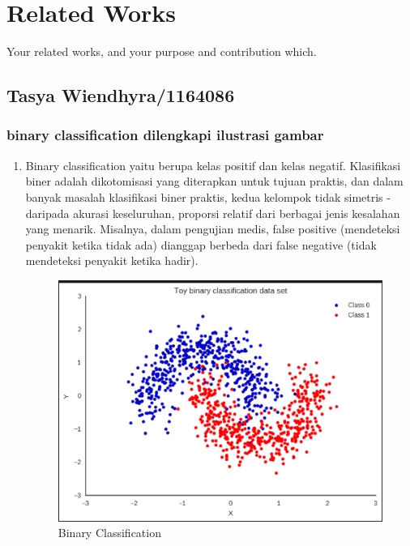 \chapter{Related Works}

Your related works, and your purpose and contribution which.
\section{Tasya Wiendhyra/1164086}
\subsection{binary classification dilengkapi ilustrasi gambar}
\begin{enumerate}
\item Binary classification yaitu berupa kelas positif dan kelas negatif. Klasifikasi biner adalah dikotomisasi yang diterapkan untuk tujuan praktis, dan dalam banyak masalah klasifikasi biner praktis, kedua kelompok tidak simetris - daripada akurasi keseluruhan, proporsi relatif dari berbagai jenis kesalahan yang menarik. Misalnya, dalam pengujian medis, false positive (mendeteksi penyakit ketika tidak ada) dianggap berbeda dari false negative (tidak mendeteksi penyakit ketika hadir).
\begin{figure}[ht]
\centering
\includegraphics[scale=0.5]{figures/wiendh1.png}
\caption{Binary Classification}
\label{contoh}
\end{figure}
\end{enumerate}

